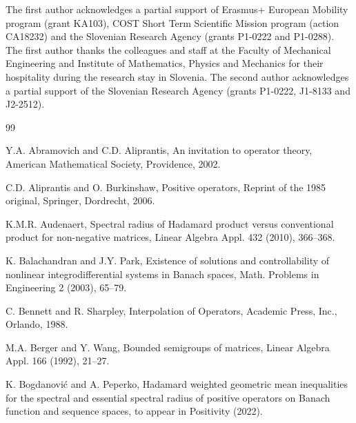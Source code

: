 \documentclass[12pt, reqno]{amsart}
\theoremstyle{definition}
\theoremstyle{remark}
\newtheorem{remark}[theorem]{Remark}
\numberwithin{equation}{section}
\begin{document}
\bigskip

The first author acknowledges a partial support of Erasmus+ European Mobility program (grant KA103), COST Short Term Scientific Mission program (action CA18232) and the Slovenian Research Agency (grants P1-0222 and P1-0288). The first author thanks the colleagues and staff at the Faculty of Mechanical Engineering and Institute of Mathematics, Physics and Mechanics for their hospitality during the research stay in Slovenia. The second author acknowledges a partial support of  the Slovenian Research Agency (grants P1-0222, J1-8133 and J2-2512).




\begin{thebibliography}{99}

 Y.A. Abramovich and C.D. Aliprantis,
 An invitation to operator theory, American Mathematical Society, Providence, 2002.

 C.D. Aliprantis and O. Burkinshaw,  Positive operators,
Reprint of the 1985 original, Springer, Dordrecht, 2006.

 K.M.R. Audenaert, Spectral radius of Hadamard product versus conventional product for non-negative matrices,
Linear Algebra Appl. 432 (2010), 366--368.%


 K. Balachandran and J.Y. Park, Existence of solutions and controllability of nonlinear integrodifferential systems in Banach spaces,  Math. Problems in Engineering 2 (2003), 65--79.


 C. Bennett and R. Sharpley,  Interpolation of Operators,
         Academic Press, Inc., Orlando, 1988.

 M.A. Berger and Y. Wang, Bounded semigroups of matrices,  Linear Algebra Appl. 166 (1992),
        21--27.
        
 K. Bogdanovi\'{c} and A. Peperko,  Hadamard weighted geometric mean inequalities for the spectral and essential spectral radius of positive operators on Banach function and sequence spaces, to appear in Positivity (2022). %



\end{thebibliography}
\end{document}
